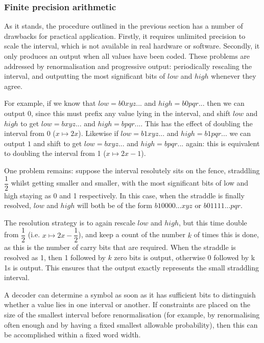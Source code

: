 \begin{informative*}
\subsubsection{Finite precision arithmetic}
As it stands, the procedure outlined in the previous section has a number of
drawbacks for practical application. Firstly, it requires unlimited precision
to scale the interval, which is not available in real hardware or software.
Secondly, it only produces an output when all values have been coded. These
problems are addressed by renormalisation and progressive output: periodically rescaling the
interval, and outputting the most significant bits of $low$ and $high$ whenever they agree.

For example, if we know that $low=b0xyz...$ and $high=b0pqr...$ then we can
output $0$, since this must prefix any value lying in the interval, 
and shift $low$ and $high$ to get $low=bxyz...$ and $high=bpqr...$.
This has the effect of doubling the interval from 0 ($x\mapsto 2x$). Likewise
if $low=b1xyz...$ and $high=b1pqr...$ we can output $1$ and shift to get
$low=bxyz...$ and $high=bpqr...$ again: this is equivalent to doubling the interval
from 1 ($x\mapsto 2x-1$).

One problem remains: suppose the interval resolutely sits on the fence, straddling
$\dfrac{1}{2}$ whilst getting smaller and smaller, with the most 
significant bits of low and high staying as 0 and 1 respectively. 
In this case, when the straddle is finally resolved, $low$ and $high$ will
both be of the form $b10000...xyz$ or $b01111...pqr$. 

The resolution strategy is to again rescale $low$ and $high$, but this time
double from $\dfrac{1}{2}$ (i.e. $x\mapsto 2x-\dfrac{1}{2}$), and keep a count of the number $k$
of times this is done, as this is the number of carry bits that are
required. When the straddle is resolved as 1, then 1 followed by $k$ zero bits is 
output, otherwise 0 followed by k 1s is output. This ensures that the
output exactly represents the small straddling interval.

A decoder can determine a symbol as soon as it has sufficient bits to distinguish
whether a value lies in one interval or another. If constraints are placed on the
 size of the smallest interval before
renormalisation (for example, by renormalising often enough and by having a fixed
smallest allowable probability), then this can be accomplished within a fixed word width.


\end{informative*}
